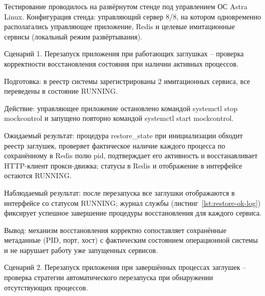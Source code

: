 Тестирование проводилось на развёрнутом стенде под управлением ОС Astra Linux. Конфигурация стенда: управляющий сервер 8/8, на котором одновременно располагались управляющее приложение, Redis и целевые имитационные сервисы (локальный режим развёртывания).

Сценарий 1. Перезапуск приложения при работающих заглушках -- проверка корректности восстановления состояния при наличии активных процессов.

\begin{compactlist}
\item Подготовка: в реестр системы зарегистрированы 2 имитационных сервиса, все переведены в состояние RUNNING.
\item Действие: управляющее приложение остановлено командой systemctl stop mockcontrol и запущено повторно командой systemctl start mockcontrol.
\item Ожидаемый результат: процедура restore\_state при инициализации обходит реестр заглушек, проверяет фактическое наличие каждого процесса по сохранённому в Redis полю pid, подтверждает его активность и восстанавливает HTTP-клиент прокси-движка; статусы в Redis и отображение в интерфейсе остаются RUNNING.
\item Наблюдаемый результат: после перезапуска все заглушки отображаются в интерфейсе со статусом RUNNING; журнал службы (листинг~\ref{lst:restore-ok-log}) фиксирует успешное завершение процедуры восстановления для каждого сервиса.
\item Вывод: механизм восстановления корректно сопоставляет сохранённые метаданные (PID, порт, хост) с фактическим состоянием операционной системы и не нарушает работу уже запущенных сервисов.
\end{compactlist}

Сценарий 2. Перезапуск приложения при завершённых процессах заглушек -- проверка стратегии автоматического перезапуска при обнаружении отсутствующих процессов.

